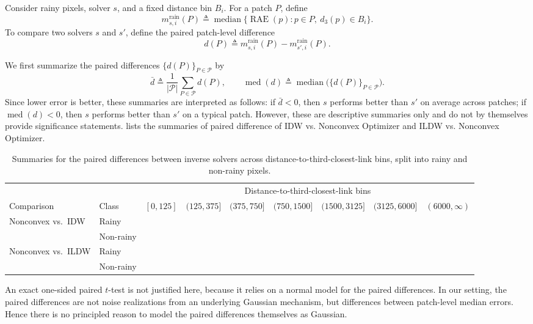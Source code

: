 \documentclass[a4paper,fleqn]{cas-sc}
\begin{document}
Consider rainy pixels, solver $s$, and a fixed distance bin $B_i$. For a patch $P$, define
\[
  m^{\mathrm{rain}}_{s,i}(P) \triangleq \operatorname{median}\bigl\{\operatorname{RAE}(p): p\in P,\ d_3(p)\in B_i \bigr\}.
\]
To compare two solvers $s$ and $s'$, define the paired patch-level difference
\[
  d(P) \triangleq m^{\mathrm{rain}}_{s,i}(P)-m^{\mathrm{rain}}_{s',i}(P).
\]

We first summarize the paired differences $\{d(P)\}_{P\in\mathcal{P}}$ by
\[
  \bar d \triangleq \frac{1}{|\mathcal{P}|}\sum_{P\in\mathcal{P}} d(P),
  \qquad
  \operatorname{med}(d) \triangleq \operatorname{median}\bigl(\{d(P)\}_{P\in\mathcal{P}}\bigr).
\]
Since lower error is better, these summaries are interpreted as follows: if $\bar d<0$, then $s$ performs better than $s'$ on average across patches; if $\operatorname{med}(d)<0$, then $s$ performs better than $s'$ on a typical patch. However, these are descriptive summaries only and do not by themselves provide significance statements.  lists the summaries of paired difference of IDW vs. Nonconvex Optimizer and ILDW vs. Nonconvex Optimizer.

\begin{table}[t]
  \centering
  \scriptsize
  \setlength{\tabcolsep}{4pt}
  \begin{tabular}{llccccccc}
    \toprule
               &                 & \multicolumn{7}{c}{Distance-to-third-closest-link bins}                  \\
    \cmidrule(lr){3-9}
    Comparison & Class
               & $[0,125]$
               & $(125,375]$
               & $(375,750]$
               & $(750,1500]$
               & $(1500,3125]$
               & $(3125,6000]$
               & $(6000,\infty)$                                                                            \\
    \midrule
    \multirow{2}{*}{Nonconvex vs.\ IDW}
               & Rainy           &                                                         &  &  &  &  &  & \\
               & Non-rainy       &                                                         &  &  &  &  &  & \\
    \midrule
    \multirow{2}{*}{Nonconvex vs.\ ILDW}
               & Rainy           &                                                         &  &  &  &  &  & \\
               & Non-rainy       &                                                         &  &  &  &  &  & \\
    \bottomrule
  \end{tabular}
  \caption{Summaries for the paired differences between inverse solvers across distance-to-third-closest-link bins, split into rainy and non-rainy pixels.}
  \label{tab:paired difference summary}
\end{table}
An exact one-sided paired $t$-test is not justified here, because it relies on a normal model for the paired differences. In our setting, the paired differences are not noise realizations from an underlying Gaussian mechanism, but differences between patch-level median errors. Hence there is no principled reason to model the paired differences themselves as Gaussian.
\end{document}

